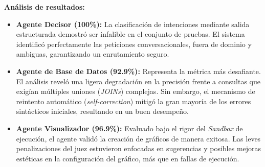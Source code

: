 \textbf{Análisis de resultados:}
\begin{itemize}
      \item \textbf{Agente Decisor (100\%):} La clasificación de intenciones mediante salida estructurada demostró ser infalible en el conjunto de pruebas. El sistema identificó perfectamente las peticiones conversacionales, fuera de dominio y ambiguas, garantizando un enrutamiento seguro.
      \item \textbf{Agente de Base de Datos (92.9\%):} Representa la métrica más desafiante. El análisis reveló una ligera degradación en la precisión frente a consultas que exigían múltiples uniones (\textit{JOINs}) complejas. Sin embargo, el mecanismo de reintento automático (\textit{self-correction}) mitigó la gran mayoría de los errores sintácticos iniciales, resultando en un buen desempeño.
      \item \textbf{Agente Visualizador (96.9\%):} Evaluado bajo el rigor del \textit{Sandbox} de ejecución, el agente validó la creación de gráficos de manera exitosa. Las leves penalizaciones del juez estuvieron enfocadas en sugerencias y posibles mejoras estéticas en la configuración del gráfico, más que en fallas de ejecución.
\end{itemize}
